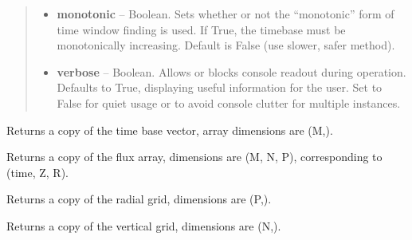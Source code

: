 \documentclass[letterpaper,10pt,english]{sphinxmanual}
\begin{document}
\begin{fulllineitems}
\begin{quote}
\begin{description}
\begin{itemize}
\item {} 
\textbf{monotonic} --
Boolean.
Sets whether or not the ``monotonic'' form of time window
finding is used. If True, the timebase must be monotonically
increasing. Default is False (use slower, safer method).

\item {} 
\textbf{verbose} --
Boolean.
Allows or blocks console readout during operation.  Defaults to True,
displaying useful information for the user.  Set to False for quiet
usage or to avoid console clutter for multiple instances.

\end{itemize}

\end{description}\end{quote}

\begin{fulllineitems}
\label{eqtools:eqtools.FromArrays.ArrayEquilibrium.getTimeBase}
Returns a copy of the time base vector, array dimensions are (M,).

\end{fulllineitems}


\begin{fulllineitems}
\label{eqtools:eqtools.FromArrays.ArrayEquilibrium.getFluxGrid}
Returns a copy of the flux array, dimensions are (M, N, P), corresponding to (time, Z, R).

\end{fulllineitems}


\begin{fulllineitems}
\label{eqtools:eqtools.FromArrays.ArrayEquilibrium.getRGrid}
Returns a copy of the radial grid, dimensions are (P,).

\end{fulllineitems}


\begin{fulllineitems}
\label{eqtools:eqtools.FromArrays.ArrayEquilibrium.getZGrid}
Returns a copy of the vertical grid, dimensions are (N,).


\end{fulllineitems}
\end{fulllineitems}
\end{document}
